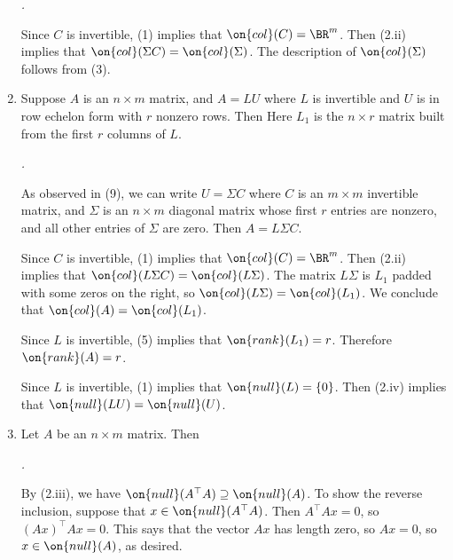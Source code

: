 \documentclass[10pt]{amsart}
\makeatletter
\renewenvironment{proof}[1][\proofname]{\par
	\pushQED{\qed}%
	\normalfont \topsep6\p@\@plus6\p@\relax
	\noindent\emph{#1.} 
	\ignorespaces
}{%
\popQED\endtrivlist\@endpefalse
}
\theoremstyle{mythm}
\theoremstyle{definition}
\theoremstyle{myrmk}
\newenvironment{myproof}{\color{blue}\begin{proof}}{\end{proof}}
\makeatother
\begin{document}
\begin{enumerate}[label=(\arabic*)]
\begin{myproof}
			Since $C$ is invertible, (1) implies that $\on{col}(C) = \BR^m$. Then (2.ii) implies that $\on{col}(\Sigma C) = \on{col}(\Sigma)$. The description of $\on{col}(\Sigma)$ follows from (3). 
		\end{myproof}
		\item Suppose $A$ is an $n \times m$ matrix, and $A = LU$ where $L$ is invertible and $U$ is in row echelon form with $r$ nonzero rows. Then 
		Here $L_1$ is the $n \times r$ matrix built from the first $r$ columns of $L$. 
		\begin{myproof}
			As observed in (9), we can write $U = \Sigma C$ where $C$ is an $m \times m$ invertible matrix, and $\Sigma$ is an $n \times m$ diagonal matrix whose first $r$ entries are nonzero, and all other entries of $\Sigma$ are zero. Then $A = L\Sigma C$. 
			
			Since $C$ is invertible, (1) implies that $\on{col}(C) = \BR^m$. Then (2.ii) implies that $\on{col}(L\Sigma C) = \on{col}(L\Sigma)$. The matrix $L \Sigma$ is $L_1$ padded with some zeros on the right, so $\on{col}(L \Sigma) = \on{col}(L_1)$. We conclude that $\on{col}(A) = \on{col}(L_1)$. 
			
			Since $L$ is invertible, (5) implies that $\on{rank}(L_1) = r$. Therefore $\on{rank}(A) = r$. 
			
			Since $L$ is invertible, (1) implies that $\on{null}(L) = \{0\}$. Then (2.iv) implies that $\on{null}(LU) = \on{null}(U)$. 
		\end{myproof}
		\item Let $A$ be an $n \times m$ matrix. Then 
		\begin{myproof}
			By (2.iii), we have $\on{null}(A^\top A) \supseteq \on{null}(A)$. To show the reverse inclusion, suppose that $x \in \on{null}(A^\top A)$. Then $A^\top Ax = 0$, so $(Ax)^\top Ax =0$. This says that the vector $Ax$ has length zero, so $Ax = 0$, so $x \in \on{null}(A)$, as desired. 
			

\end{myproof}
\end{enumerate}
\end{document}
